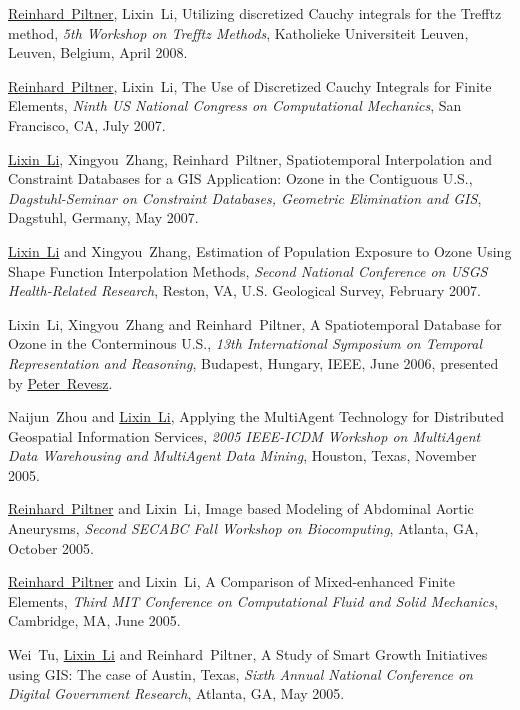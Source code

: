 \documentclass[10pt]{article}
\def\u{\underline}
\begin{document}
\begin{bibenum}
\item \u{Reinhard~Piltner}, Lixin~Li, Utilizing discretized Cauchy integrals for the Trefftz method,
{\it 5th Workshop on Trefftz Methods}, Katholieke Universiteit Leuven, Leuven, Belgium, April 2008.

\item \u{Reinhard~Piltner}, Lixin~Li, The Use of Discretized
Cauchy Integrals for Finite Elements, {\it Ninth US National
Congress on Computational Mechanics}, San Francisco, CA, July
2007.

\item \u{Lixin~Li}, Xingyou~Zhang, Reinhard~Piltner,
Spatiotemporal Interpolation and Constraint Databases for a GIS
Application: Ozone in the Contiguous U.S., {\it Dagstuhl-Seminar
on Constraint Databases, Geometric Elimination and GIS}, Dagstuhl,
Germany, May 2007.

\item \u{Lixin~Li} and Xingyou~Zhang, Estimation of Population
Exposure to Ozone Using Shape Function Interpolation Methods, {\it
Second National Conference on USGS Health-Related Research},
Reston, VA, U.S. Geological Survey, February 2007.

\item Lixin~Li, Xingyou~Zhang and Reinhard~Piltner, A
Spatiotemporal Database for Ozone in the Conterminous U.S., {\it
13th International Symposium on Temporal Representation and
Reasoning}, Budapest, Hungary, IEEE, June 2006, presented by
\u{Peter~Revesz}.

\item Naijun~Zhou and \u{Lixin~Li}, Applying the MultiAgent
Technology for Distributed Geospatial Information Services, {\it
2005 IEEE-ICDM Workshop on MultiAgent Data Warehousing and
MultiAgent Data Mining}, Houston, Texas, November 2005.

\item \u{Reinhard~Piltner} and Lixin~Li, Image based Modeling of
Abdominal Aortic Aneurysms, {\it Second SECABC Fall Workshop on
Biocomputing}, Atlanta, GA, October 2005.

\item \u{Reinhard~Piltner} and Lixin~Li, A Comparison of
Mixed-enhanced Finite Elements, {\it Third MIT Conference on
Computational Fluid and Solid Mechanics}, Cambridge, MA, June
2005.

\item Wei~Tu, \u{Lixin~Li} and Reinhard~Piltner, A Study of Smart
Growth Initiatives using GIS: The case of Austin, Texas, {\it
Sixth Annual National Conference on Digital Government Research},
Atlanta, GA, May 2005.


\end{bibenum}
\end{document}

